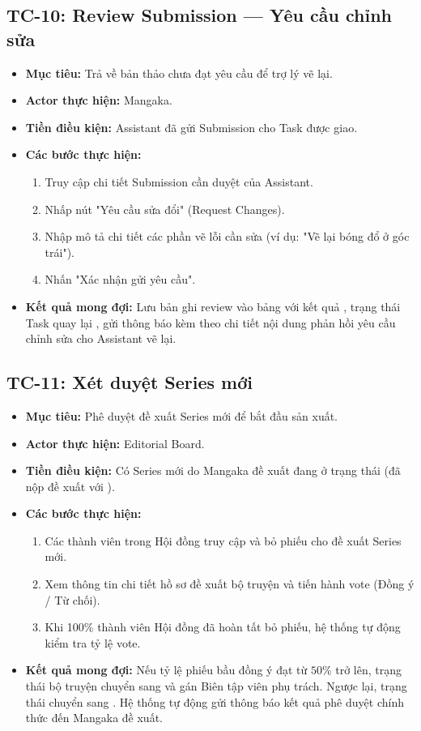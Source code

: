 \subsection{TC-10: Review Submission — Yêu cầu chỉnh sửa}
\label{subsec:tc10_review_edit}
\begin{itemize}
    \item \textbf{Mục tiêu:} Trả về bản thảo chưa đạt yêu cầu để trợ lý vẽ lại.
    \item \textbf{Actor thực hiện:} Mangaka.
    \item \textbf{Tiền điều kiện:} Assistant đã gửi Submission cho Task được giao.
    \item \textbf{Các bước thực hiện:}
    \begin{enumerate}
        \item Truy cập chi tiết Submission cần duyệt của Assistant.
        \item Nhấp nút "Yêu cầu sửa đổi" (Request Changes).
        \item Nhập mô tả chi tiết các phần vẽ lỗi cần sửa (ví dụ: "Vẽ lại bóng đổ ở góc trái").
        \item Nhấn "Xác nhận gửi yêu cầu".
    \end{enumerate}
    \item \textbf{Kết quả mong đợi:} Lưu bản ghi review vào bảng  với kết quả , trạng thái Task quay lại , gửi thông báo kèm theo chi tiết nội dung phản hồi yêu cầu chỉnh sửa cho Assistant vẽ lại.
\end{itemize}

\subsection{TC-11: Xét duyệt Series mới}
\label{subsec:tc11_approve_series}
\begin{itemize}
    \item \textbf{Mục tiêu:} Phê duyệt đề xuất Series mới để bắt đầu sản xuất.
    \item \textbf{Actor thực hiện:} Editorial Board.
    \item \textbf{Tiền điều kiện:} Có Series mới do Mangaka đề xuất đang ở trạng thái  (đã nộp đề xuất với ).
    \item \textbf{Các bước thực hiện:}
    \begin{enumerate}
        \item Các thành viên trong Hội đồng truy cập và bỏ phiếu cho đề xuất Series mới.
        \item Xem thông tin chi tiết hồ sơ đề xuất bộ truyện và tiến hành vote (Đồng ý / Từ chối).
        \item Khi 100\% thành viên Hội đồng đã hoàn tất bỏ phiếu, hệ thống tự động kiểm tra tỷ lệ vote.
    \end{enumerate}
    \item \textbf{Kết quả mong đợi:} Nếu tỷ lệ phiếu bầu đồng ý đạt từ $50\%$ trở lên, trạng thái bộ truyện chuyển sang  và gán Biên tập viên phụ trách. Ngược lại, trạng thái chuyển sang . Hệ thống tự động gửi thông báo kết quả phê duyệt chính thức đến Mangaka đề xuất.
\end{itemize}

